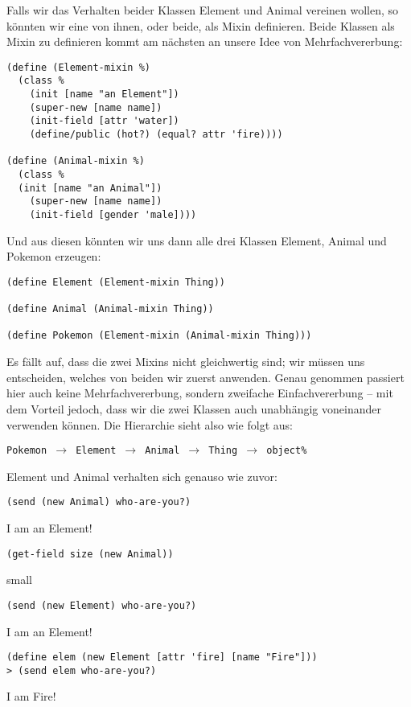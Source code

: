 Falls wir das Verhalten beider Klassen Element und Animal vereinen wollen, so könnten wir eine von ihnen, oder beide, als Mixin definieren. Beide Klassen als Mixin zu definieren kommt am nächsten an unsere Idee von Mehrfachvererbung:

\begin{lstlisting}
(define (Element-mixin %)
  (class % 
    (init [name "an Element"])
    (super-new [name name])
    (init-field [attr 'water])
    (define/public (hot?) (equal? attr 'fire))))

(define (Animal-mixin %)
  (class %
  (init [name "an Animal"])
    (super-new [name name])
    (init-field [gender 'male])))
\end{lstlisting}

Und aus diesen könnten wir uns dann alle drei Klassen Element, Animal und Pokemon erzeugen:
\begin{lstlisting}
(define Element (Element-mixin Thing))

(define Animal (Animal-mixin Thing))
 
(define Pokemon (Element-mixin (Animal-mixin Thing)))
\end{lstlisting}

Es fällt auf, dass die zwei Mixins nicht gleichwertig sind; wir müssen uns entscheiden, welches von beiden wir zuerst anwenden. Genau genommen passiert hier auch keine Mehrfachvererbung, sondern zweifache Einfachvererbung -- mit dem Vorteil jedoch, dass wir die zwei Klassen auch unabhängig voneinander verwenden können. Die Hierarchie sieht also wie folgt aus:

\texttt{Pokemon $\rightarrow$ Element $\rightarrow$ Animal $\rightarrow$ Thing $\rightarrow$ object\%}

Element und Animal verhalten sich genauso wie zuvor:

\begin{lstlisting}
(send (new Animal) who-are-you?)
\end{lstlisting}
{\routput {\qq}I am an Element!\qq}

\begin{lstlisting}
(get-field size (new Animal))
\end{lstlisting}
{\rsymbol small}

\begin{lstlisting}
(send (new Element) who-are-you?)
\end{lstlisting}
{\routput {\qq}I am an Element!\qq}

\begin{lstlisting}
(define elem (new Element [attr 'fire] [name "Fire"]))
> (send elem who-are-you?)
\end{lstlisting} 
{\routput {\qq}I am Fire!\qq}

